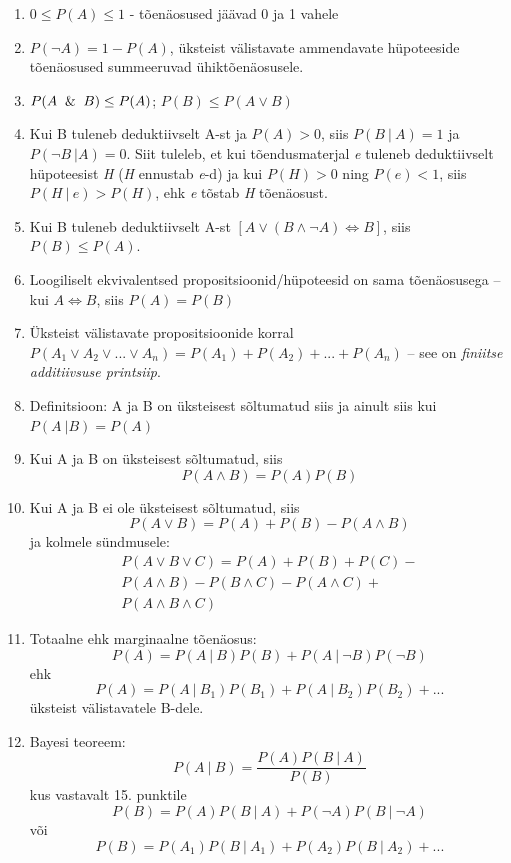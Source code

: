 \documentclass[]{book}
\begin{document}
\begin{enumerate}
\def\labelenumi{\arabic{enumi}.}
\setcounter{enumi}{4}
\item
  \(0 \leq P(A) \leq 1\) - tõenäosused jäävad 0 ja 1 vahele
\item
  \(P(\lnot A) = 1 - P(A)\), üksteist välistavate ammendavate hüpoteeside tõenäosused summeeruvad ühiktõenäosusele.
\item
  \(P(A \And B) \le P(A)\); \(P(B) \leq P(A \lor B)\)
\item
  Kui B tuleneb deduktiivselt A-st ja \(P(A) > 0\), siis \(P(B~ \vert ~A) = 1\) ja \(P(\lnot B~ \vert A) = 0\). Siit tuleleb, et kui tõendusmaterjal \emph{e} tuleneb deduktiivselt hüpoteesist \emph{H} (\emph{H} ennustab \emph{e}-d) ja kui \(P(H) > 0\) ning \(P(e) < 1\), siis \(P(H~ \lvert~ e) > P(H)\), ehk \emph{e} tõstab \emph{H} tõenäosust.
\item
  Kui B tuleneb deduktiivselt A-st \([A \lor (B \land \lnot A) \Leftrightarrow B]\), siis \(P(B) \leq P(A)\).
\item
  Loogiliselt ekvivalentsed propositsioonid/hüpoteesid on sama tõenäosusega -- kui \(A \Leftrightarrow B\), siis \(P(A) = P(B)\)
\item
  Üksteist välistavate propositsioonide korral \(P(A_1 \lor A_2 \lor ... \lor A_n) = P(A_1) + P(A_2) + ... + P(A_n)\) -- see on \emph{finiitse additiivsuse printsiip}.
\item
  Definitsioon: A ja B on üksteisest sõltumatud siis ja ainult siis kui \(P(A~ \vert B) = P(A)\)
\item
  Kui A ja B on üksteisest sõltumatud, siis \[P(A\land B) = P(A)P(B)\]
\item
  Kui A ja B ei ole üksteisest sõltumatud, siis \[P(A \lor B) = P(A) + P(B) - P(A \land B)\] ja kolmele sündmusele: \[\begin{array}{lcl} P(A \lor B \lor C) = P(A) + P(B) + P(C) - \\P(A \land B) - P(B \land C) - P(A \land C) + \\P(A \land B \land C) \end{array}\]
\item
  Totaalne ehk marginaalne tõenäosus: \[P(A) = P(A~\vert~B)P(B) + P(A~\vert~\lnot B)P(\lnot B)\] ehk \[P(A) = P(A~\vert~B_1)P(B_1) + P(A~\vert~ B_2)P(B_2) + ...\] üksteist välistavatele B-dele.
\item
  Bayesi teoreem: \[P(A~\vert~B) =\frac{P(A)P(B~\vert~A)}{P(B)}\] kus vastavalt 15. punktile \[P(B) = P(A)P(B~\vert~A) + P(\lnot A)P(B~\vert~\lnot A)\] või \[P(B) = P(A_1)P(B~\vert~A_1) + P(A_2)P(B~\vert~A_2) + ...\]
\end{enumerate}
\end{document}
